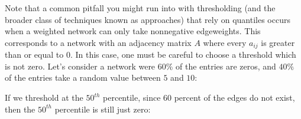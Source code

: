 \documentclass[letterpaper,10pt,english]{jupyterBook}
\begin{document}
\sphinxAtStartPar
Note that a common pitfall you might run into with thresholding (and the broader class of techniques known as  approaches) that rely on quantiles occurs when a weighted network can only take non\sphinxhyphen{}negative edge\sphinxhyphen{}weights. This corresponds to a network with an adjacency matrix \(A\) where every \(a_{ij}\) is greater than or equal to \(0\). In this case, one must be careful to choose a threshold which is not zero. Let’s consider a network were \(60\%\) of the entries are zeros, and \(40\%\) of the entries take a random value between \(5\) and \(10\):

\begin{sphinxVerbatim}[commandchars=\\\{\}]
   

  
  
      
\end{sphinxVerbatim}

\sphinxAtStartPar
If we threshold at the \(50^{th}\) percentile, since \(60\) percent of the edges do not exist, then the \(50^{th}\) percentile is still just zero:
\end{document}
